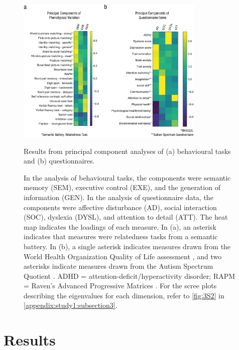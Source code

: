 \begin{figure}[p]
	\centering
	\includegraphics[width=0.8\textwidth]{study1/image/study1fig3.jpeg}
	\caption{Results from principal component analyses of (a) behavioural tasks and (b) questionnaires.}
	\caption*{In the analysis of behavioural tasks, the components were semantic memory (SEM), executive control (EXE), and the generation of information (GEN). In the analysis of questionnaire data, the components were affective disturbance (AD), social interaction (SOC), dyslexia (DYSL), and attention to detail (ATT). The heat map indicates the loadings of each measure. In (a), an asterisk indicates that measures were relatedness tasks from a semantic battery. In (b), a single asterisk indicates measures drawn from the World Health Organization Quality of Life assessment \cite{WHOQOL2002}, and two asterisks indicate measures drawn from the Autism Spectrum Quotient \cite{Baron-Cohen2001}. ADHD = attention-deficit/hyperactivity disorder; RAPM = Raven’s Advanced Progressive Matrices \cite{Raven1998}. For the scree plots describing the eigenvalues for each dimension, refer to \cref{fig:3S2} in \cref{appendix:study1:subsection3}.}
	\label{fig:study1:fig3}
\end{figure}

\section{Results}
\label{study1:results}

